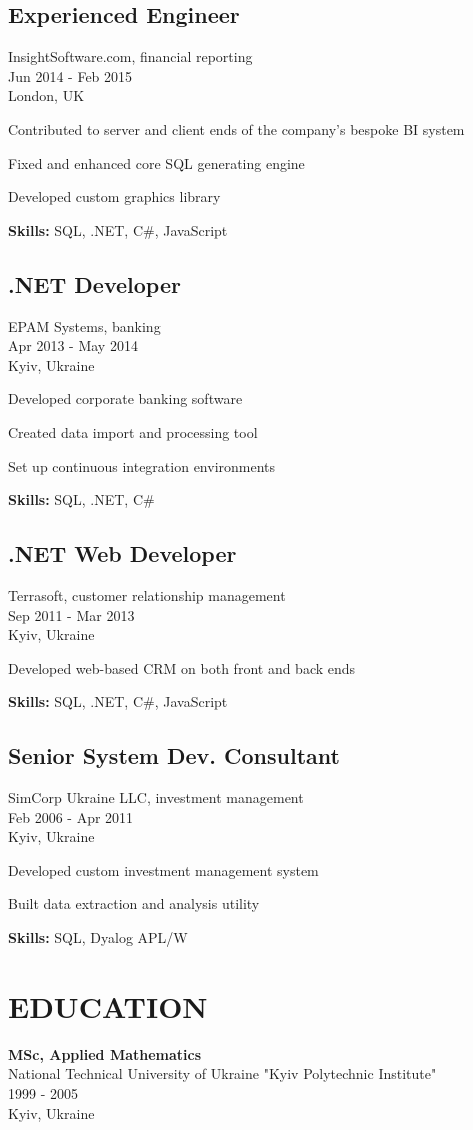 \documentclass[a4paper,10pt]{article}
\begin{document}
\subsection*{Experienced Engineer}
InsightSoftware.com, financial reporting \\
Jun 2014 - Feb 2015 \\
London, UK
\begin{bulletlist}
    \item Contributed to server and client ends of the company's bespoke BI system
    \item Fixed and enhanced core SQL generating engine
    \item Developed custom graphics library
\end{bulletlist}
\textbf{Skills:} SQL, .NET, C\#, JavaScript

\subsection*{.NET Developer}
EPAM Systems, banking \\
Apr 2013 - May 2014 \\
Kyiv, Ukraine
\begin{bulletlist}
    \item Developed corporate banking software
    \item Created data import and processing tool
    \item Set up continuous integration environments
\end{bulletlist}
\textbf{Skills:} SQL, .NET, C\#

\subsection*{.NET Web Developer}
Terrasoft, customer relationship management \\
Sep 2011 - Mar 2013 \\
Kyiv, Ukraine
\begin{bulletlist}
    \item Developed web-based CRM on both front and back ends
\end{bulletlist}
\textbf{Skills:} SQL, .NET, C\#, JavaScript

\subsection*{Senior System Dev. Consultant}
SimCorp Ukraine LLC, investment management \\
Feb 2006 - Apr 2011 \\
Kyiv, Ukraine
\begin{bulletlist}
    \item Developed custom investment management system
    \item Built data extraction and analysis utility
\end{bulletlist}
\textbf{Skills:} SQL, Dyalog APL/W

\section*{EDUCATION}
\textbf{MSc, Applied Mathematics} \\
National Technical University of Ukraine "Kyiv Polytechnic Institute" \\
1999 - 2005 \\
Kyiv, Ukraine
\end{document}
